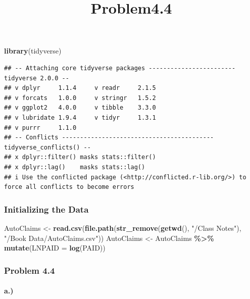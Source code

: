 \documentclass[
]{article}
\title{Problem4.4}
\author{}
\date{\vspace{-2.5em}}
\newenvironment{Shaded}{\begin{snugshade}}{\end{snugshade}}
\newcommand{\AttributeTok}[1]{\textcolor[rgb]{0.13,0.29,0.53}{#1}}
\newcommand{\FunctionTok}[1]{\textcolor[rgb]{0.13,0.29,0.53}{\textbf{#1}}}
\newcommand{\NormalTok}[1]{#1}
\newcommand{\OtherTok}[1]{\textcolor[rgb]{0.56,0.35,0.01}{#1}}
\newcommand{\SpecialCharTok}[1]{\textcolor[rgb]{0.81,0.36,0.00}{\textbf{#1}}}
\newcommand{\StringTok}[1]{\textcolor[rgb]{0.31,0.60,0.02}{#1}}
\begin{document}
\maketitle

\begin{Shaded}
\begin{Highlighting}[]
\FunctionTok{library}\NormalTok{(tidyverse)}
\end{Highlighting}
\end{Shaded}

\begin{verbatim}
## -- Attaching core tidyverse packages ------------------------ tidyverse 2.0.0 --
## v dplyr     1.1.4     v readr     2.1.5
## v forcats   1.0.0     v stringr   1.5.2
## v ggplot2   4.0.0     v tibble    3.3.0
## v lubridate 1.9.4     v tidyr     1.3.1
## v purrr     1.1.0     
## -- Conflicts ------------------------------------------ tidyverse_conflicts() --
## x dplyr::filter() masks stats::filter()
## x dplyr::lag()    masks stats::lag()
## i Use the conflicted package (<http://conflicted.r-lib.org/>) to force all conflicts to become errors
\end{verbatim}

\subsubsection{Initializing the Data}\label{initializing-the-data}

\begin{Shaded}
\begin{Highlighting}[]
\NormalTok{AutoClaims }\OtherTok{\textless{}{-}} \FunctionTok{read.csv}\NormalTok{(}\FunctionTok{file.path}\NormalTok{(}\FunctionTok{str\_remove}\NormalTok{(}\FunctionTok{getwd}\NormalTok{(), }\StringTok{"/Class Notes"}\NormalTok{), }\StringTok{"/Book Data/AutoClaims.csv"}\NormalTok{))}
\NormalTok{AutoClaims }\OtherTok{\textless{}{-}}\NormalTok{ AutoClaims }\SpecialCharTok{\%\textgreater{}\%}
  \FunctionTok{mutate}\NormalTok{(}\AttributeTok{LNPAID =} \FunctionTok{log}\NormalTok{(PAID))}
\end{Highlighting}
\end{Shaded}

\subsubsection{Problem 4.4}\label{problem-4.4}

\paragraph{a.)}\label{a.}
\end{document}
